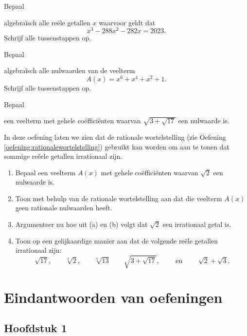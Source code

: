 \documentclass{ximera}
\begin{document}
\begin{Oefening}\setcounter{enumi}{17} 
\hypertarget{oef4.17}{Bepaal} algebra\"isch alle re\"ele getallen $x$ waarvoor geldt dat 
\[
x^3-288x^2-282x  = 2023.
\]
Schrijf alle tussenstappen op.
\end{Oefening}

\begin{Oefening}\setcounter{enumi}{18} 
\hypertarget{oef4.18}{Bepaal} algebra\"isch alle nulwaarden van de veelterm
\[
A(x) = x^6 + x^4 + x^2 + 1.
\]
Schrijf alle tussenstappen op.
\end{Oefening}

\begin{Oefening}\setcounter{enumi}{19} 
\hypertarget{oef4.19}{Bepaal} een veelterm met gehele co\"effici\"enten waarvan $\sqrt{3+\sqrt{17}}$ een nulwaarde is.
\end{Oefening}

\begin{Uitbreiding}
\begin{Oefening}
In deze oefening laten we zien dat de rationale wortelstelling (zie Oefening \ref{oefening:rationalewortelstelling}) gebruikt kan worden om aan te tonen dat sommige re\"eele getallen irrationaal zijn.
\begin{enumerate}

\item
Bepaal een veelterm $A(x)$ met gehele co\"effici\"enten waarvan $\sqrt{2}$ een nulwaarde is.
\item
Toon met behulp van de rationale wortelstelling aan dat die veelterm $A(x)$ geen rationale nulwaarden heeft.
\item
Argumenteer nu hoe uit (a) en (b) volgt dat $\sqrt{2}$ een irrationaal getal is.
\item
Toon op een gelijkaardige manier aan dat de volgende re\"ele getallen irrationaal zijn:
\[
\sqrt{17}, \qquad \sqrt[3]{2}, \qquad \sqrt[7]{13} \qquad \sqrt{3+\sqrt{17}}, 
\qquad \text{ en } \qquad \sqrt{2}+\sqrt{3}.
\]
\end{enumerate}
\end{Oefening}
\end{Uitbreiding}


\chapter{Eindantwoorden van oefeningen}
\section*{Hoofdstuk 1}
\end{document}

